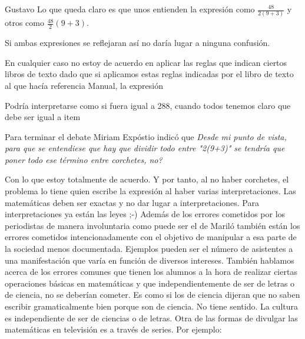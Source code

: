 \begin{opin}{\guscolor}{Gustavo}
Lo que queda claro es que unos entienden la expresión como $\frac{48}{2(9+3)}$ y otros como $\frac{48}{2}(9+3)$.

Si ambas expresiones se reflejaran así no daría lugar a ninguna confusión.

En cualquier caso no estoy de acuerdo en aplicar las reglas que indican ciertos libros de texto dado que si aplicamos estas reglas indicadas por el libro de texto al que hacía referencia Manual, la expresión 

Podría interpretarse como si fuera igual a 288, cuando todos tenemos claro que debe ser igual a item 

Para terminar el debate Miriam Expóstio indicó que 
\textit{Desde mi punto de vista, para que se entendiese que hay que dividir todo entre "2(9+3)" se tendría que poner todo ese término entre corchetes, no?}


Con lo que estoy totalmente de acuerdo. Y por tanto, al no haber corchetes, el problema lo tiene quien escribe la expresión al haber varias interpretaciones.
Las matemáticas deben ser exactas y no dar lugar a interpretaciones. Para interpretaciones ya están las leyes ;-)
Además de los errores cometidos por los periodistas de manera involuntaria como puede ser el de Mariló también están los errores cometidos intencionadamente con el objetivo de manipular a esa parte de la sociedad menos documentada. Ejemplos pueden ser el número de asistentes a una manifestación que varía en función de diversos intereses.
También hablamos acerca de los errores comunes que tienen los alumnos a la hora de realizar ciertas operaciones básicas en matemáticas y que independientemente de ser de letras o de ciencia, no se deberían cometer. Es como si los de ciencia dijeran que no saben escribir gramaticalmente bien porque son de ciencia. No tiene sentido. La cultura es independiente de ser de ciencias o de letras.
Otra de las formas de divulgar las matemáticas en televisión es a través de series. Por ejemplo:


\end{opin}
